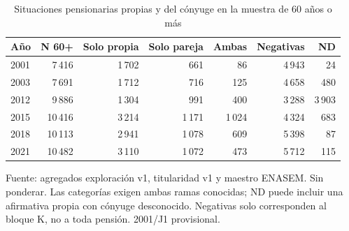 \begin{table}[!htbp]
\centering
\caption{Situaciones pensionarias propias y del cónyuge en la muestra de 60 años o más}\label{tab:exploracion-ramas}
\small\setlength{\tabcolsep}{4pt}
\renewcommand{\arraystretch}{1.15}
\begin{tabular}{lrrrrrr}
\toprule
\textbf{Año} & \textbf{N 60+} & \textbf{Solo propia} & \textbf{Solo pareja} & \textbf{Ambas} & \textbf{Negativas} & \textbf{ND} \\
\midrule
2001 & 7\,416 & 1\,702 & 661 & 86 & 4\,943 & 24 \\
2003 & 7\,691 & 1\,712 & 716 & 125 & 4\,658 & 480 \\
2012 & 9\,886 & 1\,304 & 991 & 400 & 3\,288 & 3\,903 \\
2015 & 10\,416 & 3\,214 & 1\,171 & 1\,024 & 4\,324 & 683 \\
2018 & 10\,113 & 2\,941 & 1\,078 & 609 & 5\,398 & 87 \\
2021 & 10\,482 & 3\,110 & 1\,072 & 473 & 5\,712 & 115 \\
\bottomrule
\end{tabular}
\par\medskip
\parbox{\linewidth}{\footnotesize Fuente: agregados exploración v1, titularidad v1 y maestro ENASEM. Sin ponderar. Las categorías exigen ambas ramas conocidas; ND puede incluir una afirmativa propia con cónyuge desconocido. Negativas solo corresponden al bloque K, no a toda pensión. 2001/J1 provisional.}
\end{table}
